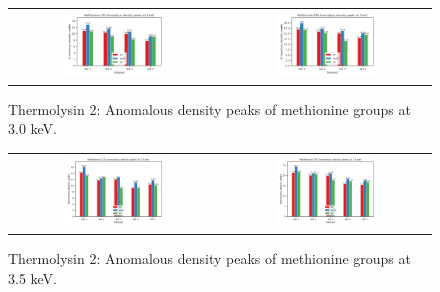 \begin{figure}
    \centering
    \begin{tabular}{cc}
        \includegraphics[width = 0.5\textwidth]{plots/exp1/tlys_2_P6122/peaks/3p0_m120_2Dbar.png} & \includegraphics[width = 0.5\textwidth]{plots/exp1/tlys_2_P6122/peaks/3p0_m205_2Dbar.png}
    \end{tabular}
    \caption{Thermolysin 2: Anomalous density peaks of methionine groups at 3.0 \unit{keV}.}
    \label{fig:tlys2_met_peaks_3p0}
\end{figure}

\begin{figure}
    \centering
    \begin{tabular}{cc}
        \includegraphics[width = 0.5\textwidth]{plots/exp1/tlys_2_P6122/peaks/3p5_m120_2Dbar.png} & \includegraphics[width = 0.5\textwidth]{plots/exp1/tlys_2_P6122/peaks/3p5_m205_2Dbar.png}
    \end{tabular}
    \caption{Thermolysin 2: Anomalous density peaks of methionine groups at 3.5 \unit{keV}.}
    \label{fig:tlys2_met_peaks_3p5}
\end{figure}

